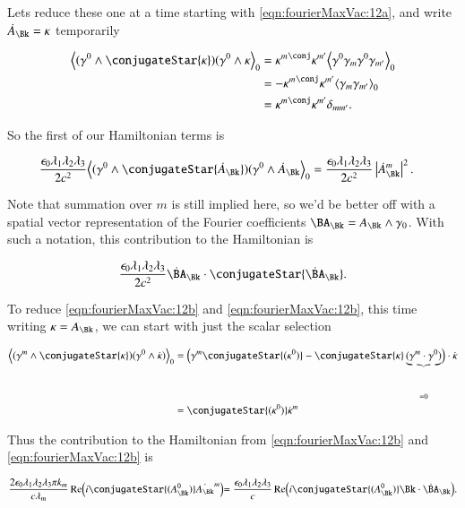 Lets reduce these one at a time starting with \autoref{eqn:fourierMaxVac:12a}, and write $\dot{A}_\Bk = \kappa$ temporarily

\begin{align*}
\gpgradezero{ (\gamma^0 \wedge \conjugateStar{\kappa} ) (\gamma^0 \wedge \kappa } 
&=
{\kappa^m}^{\conj} \kappa^{m'}
\gpgradezero{ \gamma^0 \gamma_m \gamma^0 \gamma_{m'} } \\
&=
-{\kappa^m}^{\conj} \kappa^{m'}
\gpgradezero{ \gamma_m \gamma_{m'} }  \\
&=
{\kappa^m}^{\conj} \kappa^{m'}
\delta_{m m'}.
\end{align*}

So the first of our Hamiltonian terms is

\begin{align}\label{eqn:fourierMaxVac:13}
\frac{\epsilon_0 \lambda_1 \lambda_2 \lambda_3}{2 c^2}
\gpgradezero{ (\gamma^0 \wedge \conjugateStar{\dot{A}_\Bk} ) (\gamma^0 \wedge \dot{A}_\Bk } 
&=
\frac{\epsilon_0 \lambda_1 \lambda_2 \lambda_3}{2 c^2}
\Abs{{{\dot{A}}_{\Bk}}^m}^2.
\end{align}

Note that summation over $m$ is still implied here, so we'd be better off with a spatial vector representation of the Fourier coefficients $\BA_\Bk = A_\Bk \wedge \gamma_0$.  With such a notation, this contribution to the Hamiltonian is

\begin{align}\label{eqn:fourierMaxVac:13b}
\frac{\epsilon_0 \lambda_1 \lambda_2 \lambda_3}{2 c^2} \dot{\BA}_\Bk \cdot \conjugateStar{\dot{\BA}_\Bk}.
\end{align}

To reduce \autoref{eqn:fourierMaxVac:12b} and \autoref{eqn:fourierMaxVac:12b}, this time writing $\kappa = A_\Bk$, we can start with just the scalar selection

\begin{align*}
\gpgradezero{ (\gamma^m \wedge \conjugateStar{\kappa} ) ( \gamma^0 \wedge \dot{\kappa} ) } 
&=
\Bigl( \gamma^m \conjugateStar{(\kappa^0)} - \conjugateStar{\kappa} \underbrace{(\gamma^m \cdot \gamma^0)}_{=0} \Bigr) \cdot \dot{\kappa} \\
&=
\conjugateStar{(\kappa^0)} \dot{\kappa}^m
\end{align*}

Thus the contribution to the Hamiltonian from \autoref{eqn:fourierMaxVac:12b} and \autoref{eqn:fourierMaxVac:12b} is

\begin{align}\label{eqn:fourierMaxVac:14}
\frac{2 \epsilon_0 \lambda_1 \lambda_2 \lambda_3 \pi k_m}{c \lambda_m} \Real \Bigl( i \conjugateStar{(A_\Bk^0)} \dot{A_\Bk}^m \Bigl)
=
\frac{\epsilon_0 \lambda_1 \lambda_2 \lambda_3}{c} \Real \Bigl( i \conjugateStar{(A_\Bk^0)} \Bk \cdot \dot{\BA}_\Bk \Bigl).
\end{align}

